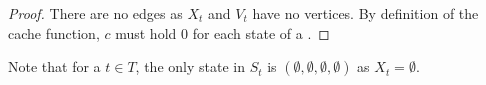 \subsubsection*{\LeafNode{}}

%
\begin{proof}
	There are no edges as \( X_t \) and \( V_t \) have no vertices.
	By definition of the cache function,
	\( c \) must hold \( 0 \) for each state of a \LeafNode{}.
\end{proof}
%
Note that for a \LeafNode{} \( t \in T \),
the only state in \( S_t \) is \( (\emptyset, \emptyset, \emptyset, \emptyset) \)
as \( X_t = \emptyset \).

\subsubsection*{\IntroduceVertexNode{}}

